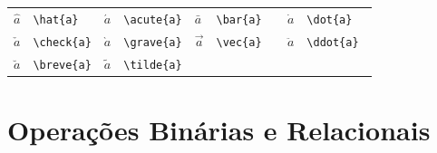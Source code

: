 \documentclass[fleqn]{icat-ufal}
\begin{document}
\begin{spacing}{1}
\begin{longtable}{p{4mm}p{25mm}p{4mm}p{25mm}p{4mm}p{25mm}p{4mm}p{25mm}} \hline
  $\hat{a}  $ & \lstinline!\hat{a}  ! &
  $\acute{a}$ & \lstinline!\acute{a}! &
  $\bar{a}  $ & \lstinline!\bar{a}  ! &
  $\dot{a}  $ & \lstinline!\dot{a}  ! \\
  $\check{a}$ & \lstinline!\check{a}! &
  $\grave{a}$ & \lstinline!\grave{a}! &
  $\vec{a}  $ & \lstinline!\vec{a}  ! &
  $\ddot{a} $ & \lstinline!\ddot{a} ! \\
  $\breve{a}$ & \lstinline!\breve{a}! &
  $\tilde{a}$ & \lstinline!\tilde{a}! \\ \hline
\end{longtable}

\section{Operações Binárias e Relacionais}


\end{spacing}
\end{document}
